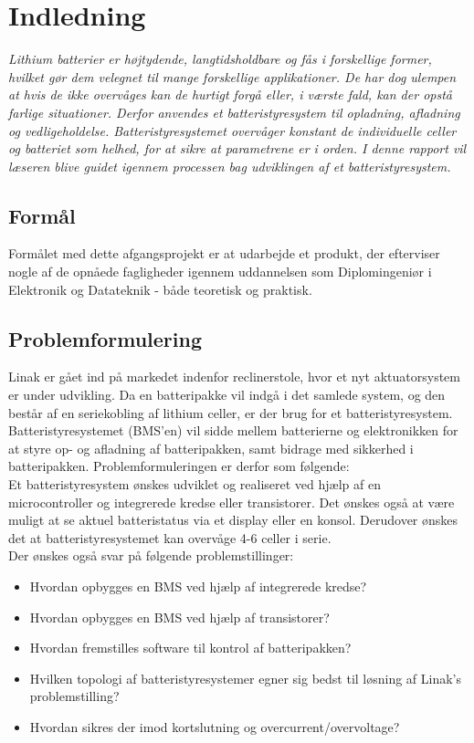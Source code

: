 \chapter{Indledning}

\emph{Lithium batterier er højtydende, langtidsholdbare og fås i forskellige former, hvilket gør dem velegnet til mange forskellige applikationer. De har dog ulempen at hvis de ikke overvåges kan de hurtigt forgå eller, i værste fald, kan der opstå farlige situationer. Derfor anvendes et batteristyresystem til opladning, afladning og vedligeholdelse. Batteristyresystemet overvåger konstant de individuelle celler og batteriet som helhed, for at sikre at parametrene er i orden. I denne rapport vil læseren blive guidet igennem processen bag udviklingen af et batteristyresystem.}

\section{Formål}
Formålet med dette afgangsprojekt er at udarbejde et produkt, der efterviser nogle af de opnåede fagligheder igennem uddannelsen som Diplomingeniør i Elektronik og Datateknik - både teoretisk og praktisk.

\section{Problemformulering}
Linak er gået ind på markedet indenfor reclinerstole, hvor et nyt aktuatorsystem er under udvikling. Da en batteripakke vil indgå i det samlede system, og den består af en seriekobling af lithium celler, er der brug for et batteristyresystem. Batteristyresystemet (BMS’en) vil sidde mellem batterierne og elektronikken for at styre op- og afladning af batteripakken, samt bidrage med sikkerhed i batteripakken. Problemformuleringen er derfor som følgende:\\

Et batteristyresystem ønskes udviklet og realiseret ved hjælp af en microcontroller og integrerede kredse eller transistorer. Det ønskes også at være muligt at se aktuel batteristatus via et display eller en konsol. Derudover ønskes det at batteristyresystemet kan overvåge 4-6 celler i serie. \\

Der ønskes også svar på følgende problemstillinger: 
\begin{itemize}[noitemsep]
	\item Hvordan opbygges en BMS ved hjælp af integrerede kredse?
	\item Hvordan opbygges en BMS ved hjælp af transistorer? 
	\item Hvordan fremstilles software til kontrol af batteripakken?
	\item Hvilken topologi af batteristyresystemer egner sig bedst til løsning af Linak's problemstilling? 
	\item Hvordan sikres der imod kortslutning og overcurrent/overvoltage? 
\end{itemize}

